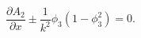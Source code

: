 \begin{equation}\label{da2} \frac{\partial A_2}{\partial x}\pm
\frac{1}{k^2}\phi_3(1-\phi_3^2)=0.\end{equation} 

